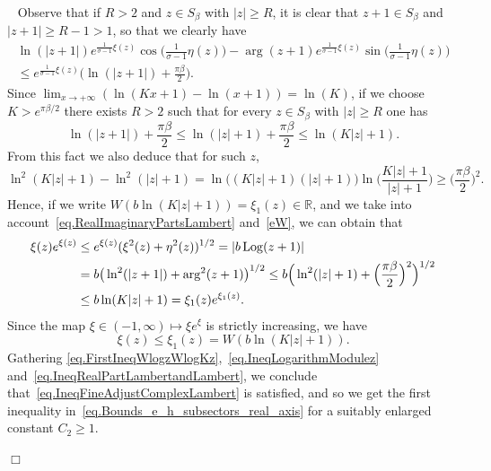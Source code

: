 \documentclass[12pt,leqno]{amsart}
\newcommand{\R}{\mathbb{R}}
\theoremstyle{plain}
\theoremstyle{definition}
\numberwithin{equation}{section}
\def\Log{\mathop{\rm Log}\nolimits}
\newenvironment{proof1}{\medskip\par\noindent{\bf Proof}\ \normalfont}{\hfill $\Box$
\medskip\par}
\begin{document}
\begin{proof1}
Observe that if $R>2$ and $z\in S_{\beta}$ with $|z|\ge R$, it is clear that $z+1\in S_{\beta}$ and $|z+1|\ge R-1>1$, so that we clearly have
\begin{multline}\label{eq.FirstIneqWlogzWlogKz}
\ln(|z+1|) e^{\frac{1}{\sigma-1}\xi(z)} \cos\big(\frac{1}{\sigma-1}\eta(z)\big)-
\arg(z+1)e^{\frac{1}{\sigma-1}\xi(z)} \sin\big(\frac{1}{\sigma-1}\eta(z)\big)\\
\le e^{\frac{1}{\sigma-1}\xi(z)}\Big(\ln(|z+1|)+\frac{\pi\beta}{2}\Big).
\end{multline}
Since $\lim_{x\to +\infty}(\ln(Kx+1)-\ln(x+1))=\ln(K)$, if we choose $K>e^{\pi\beta/2}$ there exists $R>2$ such that for every $z\in S_{\beta}$ with $|z|\ge R$ one has
\begin{equation}\label{eq.IneqLogarithmModulez}
\ln(|z+1|)+\frac{\pi\beta}{2}\le\ln(|z|+1)+\frac{\pi\beta}{2}\le\ln(K|z|+1).
\end{equation}
From this fact we also deduce that for such $z$,
\begin{equation*}%
\ln^2(K|z|+1)-\ln^2(|z|+1)= \ln\big((K|z|+1)(|z|+1)\big)\ln\Big(\frac{K|z|+1}{|z|+1}\Big)
\ge\Big(\frac{\pi\beta}{2}\Big)^2.
\end{equation*}
Hence, if we write $W(b\ln(K|z|+1))=\xi_1(z)\in\R$, and we take into account~\eqref{eq.RealImaginaryPartsLambert} and~\eqref{eW}, we can obtain that
\begin{align*}
\xi(z)e^{\xi(z)}&\le e^{\xi(z)}(\xi^2(z)+\eta^2(z))^{1/2}=|b\Log(z+1)|\\
&=b\big(\ln^2(|z+1|)+\arg^2(z+1)\big)^{1/2}\le b\Big(\ln^2(|z|+1)+\Big(\frac{\pi\beta}{2}\Big)^2\Big)^{1/2}\\
&\le b\ln(K|z|+1)=\xi_1(z)e^{\xi_1(z)}.
\end{align*}
Since the map $\xi\in(-1,\infty)\mapsto\xi e^{\xi}$ is strictly increasing, we have
\begin{equation}\label{eq.IneqRealPartLambertandLambert}
\xi(z)\le\xi_1(z)=W(b\ln(K|z|+1)).
\end{equation}
Gathering \eqref{eq.FirstIneqWlogzWlogKz},~\eqref{eq.IneqLogarithmModulez} and~\eqref{eq.IneqRealPartLambertandLambert}, we conclude that~\eqref{eq.IneqFineAdjustComplexLambert} is satisfied, and so we get the first inequality in~\eqref{eq.Bounds_e_h_subsectors_real_axis} for a suitably enlarged constant $C_2\ge 1$.


\end{proof1}
\end{document}
